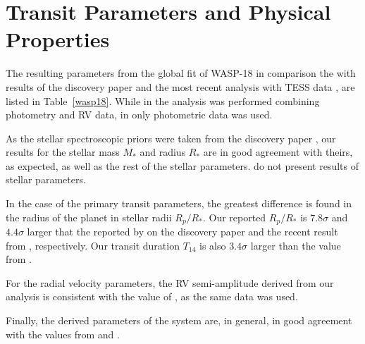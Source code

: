 \section{Transit Parameters and Physical Properties}\label{transitparams}

The resulting parameters from the global fit of WASP-18 in comparison the with results of the discovery paper \cite{Hellier2009} and the most recent analysis with TESS data \citep{Shporer2018}, are listed in Table~\ref{wasp18}. While in \cite{Hellier2009} the analysis was performed combining photometry and RV data, in \cite{Shporer2018} only photometric data was used. 

As the stellar spectroscopic priors were taken from the discovery paper \cite{Hellier2009}, our results for the stellar mass $M_*$ and radius $R_*$ are in good agreement with theirs, as expected, as well as the rest of the stellar parameters. \cite{Shporer2018} do not present results of stellar parameters.

In the case of the primary transit parameters, the greatest difference is found in the radius of the planet in stellar radii $R_{p}/R_{*}$. Our reported $R_{p}/R_{*}$ is $7.8\sigma$ and $4.4\sigma$ larger that the reported by \cite{Hellier2009} on the discovery paper and the recent result from \cite{Shporer2018}, respectively.  Our transit duration $T_{14}$ is also $3.4\sigma$ larger than the value from \cite{Hellier2009}.

For the radial velocity parameters, the RV semi-amplitude derived from our analysis is consistent with the value of \cite{Hellier2009}, as the same data was used. 

Finally, the derived parameters of the system are, in general, in good agreement with the values from \cite{Hellier2009} and \cite{Shporer2018}. 



